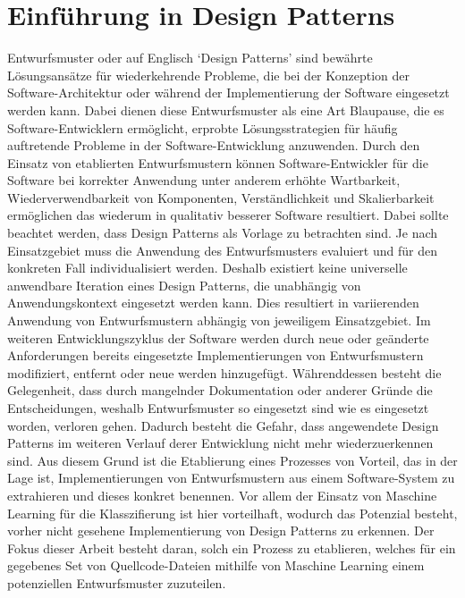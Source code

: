 \section{Einführung in Design Patterns}

Entwurfsmuster oder auf Englisch `Design Patterns' sind bewährte Lösungsansätze für wiederkehrende Probleme, die bei der Konzeption der Software-Architektur oder während der Implementierung der Software
eingesetzt werden kann. Dabei dienen diese Entwurfsmuster als eine Art Blaupause, die es Software-Entwicklern ermöglicht, erprobte Lösungsstrategien für häufig auftretende Probleme in der Software-Entwicklung anzuwenden.
Durch den Einsatz von etablierten Entwurfsmustern können Software-Entwickler für die Software bei korrekter Anwendung unter anderem erhöhte Wartbarkeit, Wiederverwendbarkeit von Komponenten, Verständlichkeit und Skalierbarkeit ermöglichen das wiederum in qualitativ besserer Software resultiert.
Dabei sollte beachtet werden, dass Design Patterns als Vorlage zu betrachten sind. Je nach Einsatzgebiet muss die Anwendung des Entwurfsmusters evaluiert und für den konkreten Fall individualisiert werden.
Deshalb existiert keine universelle anwendbare Iteration eines Design Patterns, die unabhängig von Anwendungskontext eingesetzt werden kann. Dies resultiert in variierenden Anwendung von Entwurfsmustern abhängig von jeweiligem Einsatzgebiet.
Im weiteren Entwicklungszyklus der Software werden durch neue oder geänderte Anforderungen bereits eingesetzte Implementierungen von Entwurfsmustern modifiziert, entfernt oder neue werden hinzugefügt.
Währenddessen besteht die Gelegenheit, dass durch mangelnder Dokumentation oder anderer Gründe die Entscheidungen, weshalb Entwurfsmuster so eingesetzt sind wie es eingesetzt worden, verloren gehen.
Dadurch besteht die Gefahr, dass angewendete Design Patterns im weiteren Verlauf derer Entwicklung nicht mehr wiederzuerkennen sind. Aus diesem Grund ist die Etablierung eines Prozesses von Vorteil, das in der Lage ist,
Implementierungen von Entwurfsmustern aus einem Software-System zu extrahieren und dieses konkret benennen. Vor allem der Einsatz von Maschine Learning für die Klasszifierung ist hier vorteilhaft, wodurch das Potenzial besteht, vorher nicht gesehene Implementierung von Design Patterns zu erkennen.
Der Fokus dieser Arbeit besteht daran, solch ein Prozess zu etablieren, welches für ein gegebenes Set von Quellcode-Dateien mithilfe von Maschine Learning einem potenziellen Entwurfsmuster zuzuteilen.  

